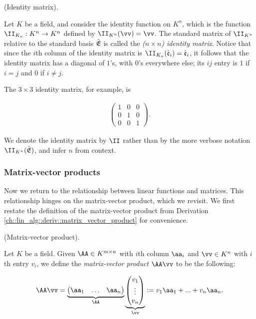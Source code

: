 \begin{defn}
    (Identity matrix).
    
    Let $K$ be a field, and consider the identity function on $K^n$, which is the function $\II_{K_n}:K^n \rightarrow K^n$ defined by $\II_{K^n}(\vv) = \vv$. The standard matrix of $\II_{K^n}$ relative to the standard basis ${\hat{\mathfrak{E}}}$ is called the \textit{($n \times n$) identity matrix}. Notice that since the $i$th column of the identity matrix is $\II_{K_n}(\see_i) = \see_i$, it follows that the identity matrix has a diagonal of $1$'s, with $0$'s everywhere else; its $ij$ entry is $1$ if $i = j$ and $0$ if $i \neq j$. 
    
    The $3 \times 3$ identity matrix, for example, is
    
    \begin{align*}
        \begin{pmatrix}
            1 & 0 & 0 \\
            0 & 1 & 0 \\
            0 & 0 & 1
        \end{pmatrix}.
    \end{align*}
    
    We denote the identity matrix by $\II$ rather than by the more verbose notation $\II_{K^n}(\sE)$, and infer $n$ from context.
\end{defn}

\subsubsection{Matrix-vector products}

Now we return to the relationship between linear functions and matrices. This relationship hinges on the matrix-vector product, which we revisit. We first restate the definition of the matrix-vector product from Derivation \ref{ch::lin_alg::deriv::matrix_vector_product} for convenience.

\begin{defn}
    (Matrix-vector product).

    Let $K$ be a field. Given $\AA \in K^{m \times n}$ with $i$th column $\aa_i$ and $\vv \in K^n$ with $i$th entry $v_i$, we define the \textit{matrix-vector product} $\AA \vv$ to be the following:

    \begin{align*}
        \AA \vv =
        \underbrace
        {\begin{pmatrix} 
            \aa_1 & \hdots & \aa_n
        \end{pmatrix}}_\AA
        \underbrace{
        \begin{pmatrix} 
            v_1 \\ \vdots \\ v_n 
        \end{pmatrix}}_\vv
        :=
        v_1 \aa_1 + ... + v_n \aa_n.
    \end{align*}
\end{defn}

